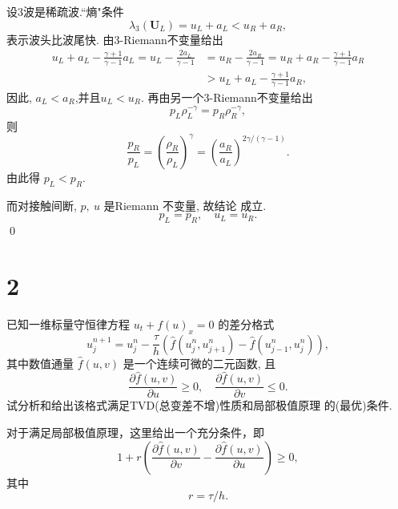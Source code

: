 \documentclass[12pt]{article}
\begin{document}
设3波是稀疏波.“熵"条件
\begin{equation}
	\lambda_{3}\left(\boldsymbol{U}_{L}\right)=u_{L}+a_{L}<u_{R}+a_{R},
\end{equation}
表示波头比波尾快.
由3-Riemann不变量给出
\begin{align}
u_{L}+a_{L} -\frac{\gamma+1}{\gamma-1} a_{L}=u_{L}-\frac{2 a_{L}}{\gamma-1}&=u_{R}-\frac{2 a_{R}}{\gamma-1}=u_{R}+a_{R}-\frac{\gamma+1}{\gamma-1} a_{R} \\
&>u_{L}+a_{L}-\frac{\gamma+1}{\gamma-1} a_{R},
\end{align}
因此, $a_{L}<a_{R}$,并且$u_L<u_R$.
再由另一个3-Riemann不变量给出
\begin{equation}
	p_{L} \rho_{L}^{-\gamma}=p_{R} \rho_{R}^{-\gamma},
\end{equation}
则
\begin{equation}
	\frac{p_{R}}{p_{L}}=\left(\frac{\rho_{R}}{\rho_{L}}\right)^{\gamma}=\left(\frac{a_{R}}{a_{L}}\right)^{2 \gamma /(\gamma-1)}.
\end{equation}
由此得 $p_{L}<p_{R} .$

而对接触间断, $p,\ u$ 是Riemann 不变量, 故结论 成立.
\begin{equation}
	p_L=p_R,\quad u_L=u_R.
\end{equation}\qed

\section{2}

已知一维标量守恒律方程 $u_{t}+f(u)_{x}=0$ 的差分格式
\begin{equation}
	u_{j}^{n+1}=u_{j}^{n}-\frac{\tau}{h}\left(\hat{f}\left(u_{j}^{n}, u_{j+1}^{n}\right)-\hat{f}\left(u_{j-1}^{n}, u_{j}^{n}\right)\right),
\end{equation}
其中数值通量 $\hat{f}(u, v)$ 是一个连续可微的二元函数, 且
\begin{equation}
	\frac{\partial \hat{f}(u, v)}{\partial u} \geq 0, \quad \frac{\partial \hat{f}(u, v)}{\partial v} \leq 0.
\end{equation}
试分析和给出该格式满足TVD(总变差不增)性质和局部极值原理 的(最优)条件.

对于满足局部极值原理，这里给出一个充分条件，即
\begin{equation}
	1+r\left(\frac{\partial \hat{f}(u, v)}{\partial v}-\frac{\partial \hat{f}(u, v)}{\partial u}\right)\geq 0,
	\label{eq:21}
\end{equation}
其中
\begin{equation}
	r = \tau/h.
\end{equation}
\end{document}
